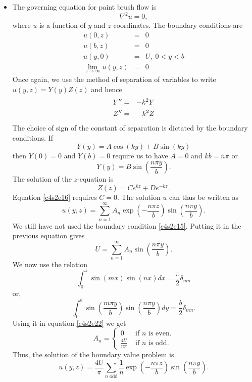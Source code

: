 \begin{itemize}
\item The governing equation for paint brush flow is
\begin{equation}\label{c4s2e12}
\nabla^2 u = 0,
\end{equation}
where $u$ is a function of $y$ and $z$ coordinates. The boundary conditions are
\begin{eqnarray}
u(0, z) &=& 0 \label{c4s2e13} \\
u(b, z) &=& 0 \label{c4s2e14} \\
u(y, 0) &=& U,\; 0 < y < b \label{c4s2e15} \\
\lim_{z \rightarrow \infty}u(y, z) &=& 0 \label{c4s2e16}
\end{eqnarray}
Once again, we use the method of separation of variables to write $u(y, z) = Y(y)Z(z)$ and hence
\begin{eqnarray*}
Y^{\prime\prime} &=& -k^2 Y \\
Z^{\prime\prime} &=& k^2 Z
\end{eqnarray*}
The choice of sign of the constant of separation is dictated by the boundary conditions. If
\[
Y(y) = A\cos(ky) + B\sin(ky)
\]
then $Y(0) = 0$ and $Y(b) = 0$ require us to have $A = 0$ and $kb = n\pi$ or
\begin{equation}\label{c4s2e17}
Y(y) = B\sin\left(\frac{n\pi y}{b}\right).
\end{equation}
The solution of the $z$-equation is
\[
Z(z) = Ce^{kz} + De^{-kz}.
\]
Equation \eqref{c4s2e16} requires $C = 0$. The solution $u$ can thus be written as
\begin{equation}\label{c4s2e18}
u(y, z) = \sum_{n=1}^\infty A_n \exp\left(-\frac{n\pi z}{b}\right)\sin\left(\frac{n\pi y}{b}\right).
\end{equation}
We still have not used the boundary condition \eqref{c4s2e15}. Putting it in the
previous equation gives
\begin{equation}\label{c4s2e19}
U = \sum_{n=1}^\infty A_n \sin\left(\frac{n\pi y}{b}\right).
\end{equation}
We now use the relation
\begin{equation}\label{c4s2e20}
\int_0^\pi\sin(mx)\sin(nx)dx = \frac{\pi}{2}\delta_{mn}
\end{equation}
or,
\begin{equation}\label{c4s2e21}
\int_0^b \sin\left(\frac{m\pi y}{b}\right)\sin\left(\frac{n\pi y}{b}\right)dy = \frac{b}{2}\delta_{mn}.
\end{equation}
Using it in equation \eqref{c4s2e22} we get
\begin{equation}\label{c4s2e22}
A_n = \begin{cases}
0 & \text{ if } n \text{ is even.} \\
\frac{4U}{n\pi} & \text{ if } n \text{ is odd.}
\end{cases}
\end{equation}
Thus, the solution of the boundary value problem is
\begin{equation}\label{c4s2e23}
u(y, z) = \frac{4U}{\pi}\sum_{n\text{ odd}} \frac{1}{n}\exp\left(-\frac{n\pi z}{b}\right)\sin\left(\frac{n\pi y}{b}\right).
\end{equation}


\end{itemize}
